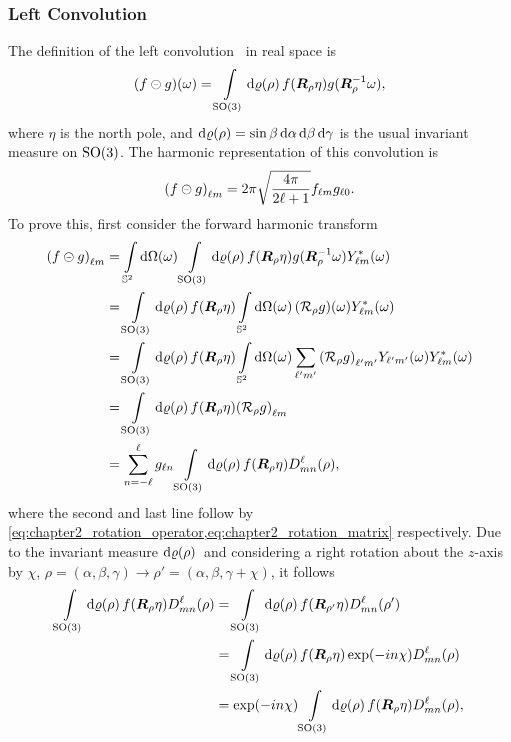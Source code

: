 \subsubsection{Left Convolution}

The definition of the left convolution~\cite{Kennedy2011,Driscoll1994} in real space is
%
\begin{equation}
	\pixel{(f \circleddash g)}
	= \integrateRotation{\rho} f(\rotationMatrix\eta) g(\rotationMatrix^{-1}\omega),
\end{equation}
%
where \({\eta}\) is the north pole, and \(\rotationVolume=\sin{\beta} \dd{\alpha} \dd{\beta} \dd{\gamma}\) is the usual invariant measure on \(\rotationGroup{}\).
The harmonic representation of this convolution is
%
\begin{equation}
	\harmonic{(f \circleddash g)}
	= 2\pi \sqrt{\inverseFactor} \harmonic{f} \axiHarmonic{g}.
\end{equation}
%
To prove this, first consider the forward harmonic transform
%
\begin{align}
	\harmonic{(f \circleddash g)}
	 & = \integrateSphere{\omega} \integrateRotation{\rho} f(\rotationMatrix\eta) g(\rotationMatrix^{-1}\omega) \pixel{\conj{\harmonic{Y}}} \nonumber{}                                            \\
	 & = \integrateRotation{\rho} f(\rotationMatrix\eta) \integrateSphere{\omega} \pixel{(\rotation{\rho}g)} \pixel{\conj{\harmonic{Y}}} \nonumber{}                                               \\
	 & = \integrateRotation{\rho} f(\rotationMatrix\eta) \integrateSphere{\omega} \harmonicSum['] \harmonic[']{(\rotation{\rho}g)} \pixel{\harmonic[']{Y}} \pixel{\conj{\harmonic{Y}}} \nonumber{} \\
	 & = \integrateRotation{\rho} f(\rotationMatrix\eta) \harmonic{(\rotation{\rho}g)} \nonumber{}                                                                                                 \\
	 & = \wignerSum g_{\ell n} \integrateRotation{\rho} f(\rotationMatrix\eta) \wigner{\ell}{m}{n}(\rho),
\end{align}
%
where the second and last line follow by \cref{eq:chapter2_rotation_operator,eq:chapter2_rotation_matrix} respectively.
Due to the invariant measure \(\rotationVolume{}\) and considering a right rotation about the \(z\)-axis by \({\chi}\), \ie{} \(\rho = (\alpha,\beta,\gamma) \rightarrow \rho' = (\alpha,\beta,\gamma+\chi)\), it follows
%
\begin{align}\label{eq:chapter3_so3_integral}
	\integrateRotation{\rho} f(\rotationMatrix\eta) \wigner{\ell}{m}{n}(\rho)
	 & = \integrateRotation{\rho} f(\rotationMatrix[']\eta) \wigner{\ell}{m}{n}(\rho') \nonumber{}            \\
	 & = \integrateRotation{\rho} f(\rotationMatrix\eta) \exp(-i n\chi) \wigner{\ell}{m}{n}(\rho) \nonumber{} \\
	 & = \exp(-i n\chi) \integrateRotation{\rho} f(\rotationMatrix\eta) \wigner{\ell}{m}{n}(\rho),
\end{align}

